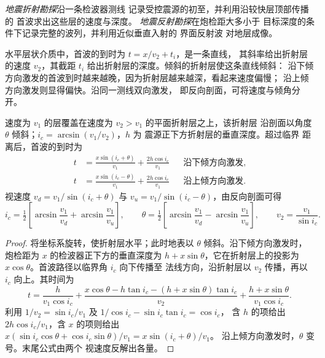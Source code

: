 \begin{definition}[地震折射与反射勘探]\label{def:b3:exploration-seismology:surveys}
\emph{地震折射勘探}沿一条检波器测线
记录受控震源的初至，并利用沿较快层顶部传播的
首波求出这些层的速度与深度。
\emph{地震反射勘探}在炮检距大多小于
目标深度的条件下记录完整的波列，并利用近似垂直入射的
界面反射波
对地层成像。
\end{definition}

水平层状介质中，首波的到时为 $t = x/v_2 + t_i$，是一条直线，
其斜率给出折射层的速度 $v_2$，其截距 $t_i$
给出折射层的深度。倾斜的折射层使这条直线倾斜：
沿下倾方向激发的首波到时越来越晚，因为折射层越来越深，看起来速度偏慢；
沿上倾方向激发则显得偏快。沿同一测线双向激发，
即反向剖面，可将速度与倾角分开。

\begin{theorem}[倾斜界面上的折射]\label{thm:b3:exploration-seismology:dipping}
速度为 $v_1$ 的层覆盖在速度为 $v_2 > v_1$ 的平面折射层之上，该折射层
沿剖面以角度 $\theta$ 倾斜；$i_c = \arcsin(v_1/v_2)$，$h$ 为
震源正下方折射层的垂直深度。超过临界
距离后，首波的到时为
\begin{align*}
  t &= \frac{x\sin(i_c + \theta)}{v_1} + \frac{2h\cos i_c}{v_1}
  &&\text{沿下倾方向激发},\\
  t &= \frac{x\sin(i_c - \theta)}{v_1} + \frac{2h\cos i_c}{v_1}
  &&\text{沿上倾方向激发}.
\end{align*}
视速度 $v_d = v_1/\sin(i_c + \theta)$ 与
$v_u = v_1/\sin(i_c - \theta)$，由反向剖面可得
\[
  i_c = \tfrac12\left[\arcsin\frac{v_1}{v_d} + \arcsin\frac{v_1}{v_u}\right],\qquad
  \theta = \tfrac12\left[\arcsin\frac{v_1}{v_d} - \arcsin\frac{v_1}{v_u}\right],
  \qquad v_2 = \frac{v_1}{\sin i_c} .
\]
\end{theorem}

\begin{proof}
将坐标系旋转，使折射层水平；此时地表以
$\theta$ 倾斜。沿下倾方向激发时，炮检距为 $x$ 的检波器正下方的垂直深度为
$h + x\sin\theta$，它在折射层上的投影为
$x\cos\theta$。首波路径以临界角 $i_c$ 向下传播至
法线方向，沿折射层以 $v_2$ 传播，再以 $i_c$ 向上。其时间为
\[
  t = \frac{h}{v_1\cos i_c} + \frac{x\cos\theta - h\tan i_c - (h + x\sin\theta)\tan i_c}{v_2}
  + \frac{h + x\sin\theta}{v_1\cos i_c}.
\]
利用 $1/v_2 = \sin i_c/v_1$ 及 $1/\cos i_c - \sin i_c\tan i_c = \cos i_c$，
含 $h$ 的项给出 $2h\cos i_c/v_1$，含 $x$ 的项则给出
$x(\sin i_c\cos\theta + \cos i_c\sin\theta)/v_1 = x\sin(i_c + \theta)/v_1$。
沿上倾方向激发时，$\theta$ 变号。末尾公式由两个
视速度反解出各量。
\end{proof}

